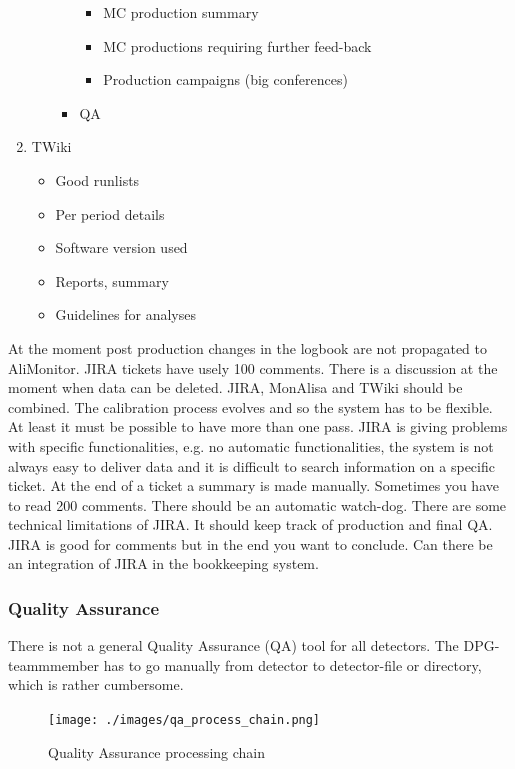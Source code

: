 \begin{enumerate}
\begin{itemize}
\begin{itemize}
\begin{itemize}
        \item MC production summary
        \item MC productions requiring further feed-back
        \item Production campaigns (big conferences)
      \end{itemize}
      \item QA
    \end{itemize}
  \end{itemize}
  \item TWiki
    \begin{itemize}
      \item Good runlists
      \item Per period details
      \item Software version used
      \item Reports, summary
      \item Guidelines for analyses
    \end{itemize}
\end{enumerate}
At the moment post production changes in the logbook are not propagated to AliMonitor. JIRA tickets have usely 100 comments. There is a discussion at the moment when data can be deleted. JIRA, MonAlisa and TWiki should be combined. The calibration process evolves and so the system has to be flexible. At least it must be possible to have more than one pass. JIRA is giving problems with specific functionalities, e.g. no automatic functionalities, the system is not always easy to deliver data and it is difficult to search information on a specific ticket. At the end of a ticket a summary is made manually. Sometimes you have to read 200 comments. There should be an automatic watch-dog. There are some technical limitations of JIRA. It should keep track of production and final QA. JIRA is good for comments but in the end you want to conclude. Can there be an integration of JIRA in the bookkeeping system.

\subsubsection{Quality Assurance}

There is not a general Quality Assurance (QA) tool for all detectors. The DPG-teammmember has to go manually from detector to detector-file or directory, which is rather cumbersome. 

\begin{figure}
  \begin{center}
    \texttt{[image: ./images/qa\_process\_chain.png]}
    \caption{Quality Assurance processing chain}
    \label{fig:}
  \end{center}
\end{figure}

